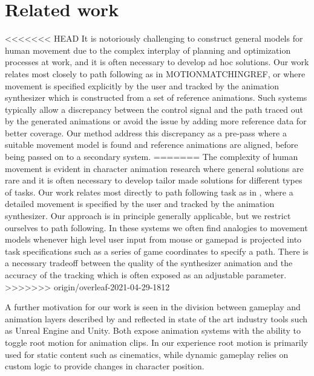 \section{Related work}
<<<<<<< HEAD
It is notoriously challenging to construct general models for human movement due to the complex interplay of planning and optimization processes at work, and it is often necessary to develop ad hoc solutions. Our work relates most closely to path following as in MOTIONMATCHINGREF, \citep{holden.16} or \citep{startke20} where movement is specified explicitly by the user and tracked by the animation synthesizer which is constructed from a set of reference animations. Such systems typically allow a discrepancy between the control signal and the path traced out by the generated animations or avoid the issue by adding more reference data for better coverage. Our method address this discrepancy as a pre-pass where a suitable movement model is found and reference animations are aligned, before being passed on to a secondary system.  
=======
The complexity of human movement is evident in character animation research where general solutions are rare and it is often necessary to develop tailor made solutions for different types of tasks. Our work relates most directly to path following task as in \citep{lee10}, \citep{holden.16} where a detailed movement is specified by the user and tracked by the animation synthesizer. Our approach is in principle generally applicable, but we restrict ourselves to path following. In these systems we often find analogies to movement models whenever high level user input from mouse or gamepad is projected into task specifications such as a series of game coordinates to specify a path. There is a necessary tradeoff between the quality of the synthesizer animation and the accuracy of the tracking which is often exposed as an adjustable parameter.
>>>>>>> origin/overleaf-2021-04-29-1812

A further motivation for our work is seen in the division between gameplay and animation layers described by \citep{holden18} and reflected in state of the art industry tools such as Unreal Engine and Unity. Both expose animation systems with the ability to toggle root motion for animation clips. In our experience root motion is primarily used for static content such as cinematics, while dynamic gameplay relies on custom logic to provide changes in character position. 

